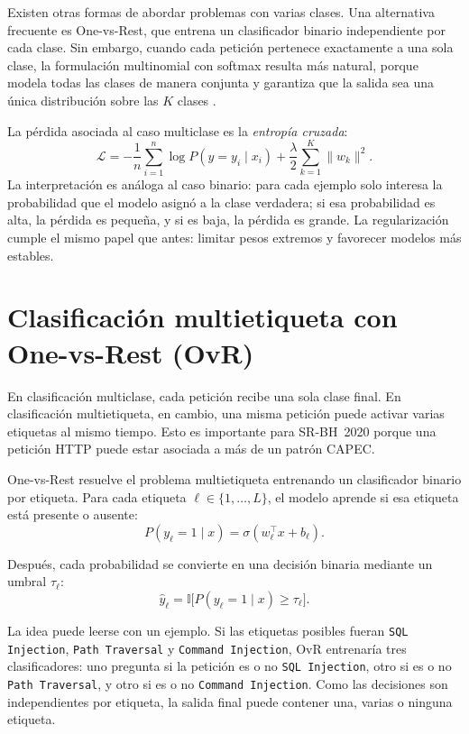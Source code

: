 \documentclass[12pt,oneside]{report}
\newcommand{\ind}{\mathbb{I}} %
\begin{document}
Existen otras formas de abordar problemas con varias clases. Una alternativa
frecuente es One-vs-Rest, que entrena un clasificador binario independiente
por cada clase. Sin embargo, cuando cada petición pertenece exactamente a
una sola clase, la formulación multinomial con softmax resulta más natural,
porque modela todas las clases de manera conjunta y garantiza que la salida
sea una única distribución sobre las $K$ clases
\cite{sklearn_logreg,islr_logreg}.

La pérdida asociada al caso multiclase es la \textit{entropía cruzada}:
\[
\mathcal{L}=
-\frac{1}{n}\sum_{i=1}^{n}\log P(y=y_i\mid x_i)
+ \frac{\lambda}{2}\sum_{k=1}^{K}\lVert w_k\rVert^2.
\]
La interpretación es análoga al caso binario: para cada ejemplo solo
interesa la probabilidad que el modelo asignó a la clase verdadera; si esa
probabilidad es alta, la pérdida es pequeña, y si es baja, la pérdida es
grande. La regularización cumple el mismo papel que antes: limitar pesos
extremos y favorecer modelos más estables.

\section{Clasificación multietiqueta con One-vs-Rest (OvR)}

En clasificación multiclase, cada petición recibe una sola clase final. En clasificación multietiqueta, en cambio, una misma petición puede activar varias etiquetas al mismo tiempo. Esto es importante para SR-BH~2020 porque una petición HTTP puede estar asociada a más de un patrón CAPEC.

One-vs-Rest resuelve el problema multietiqueta entrenando un clasificador binario por etiqueta. Para cada etiqueta $\ell\in\{1,\dots,L\}$, el modelo aprende si esa etiqueta está presente o ausente:
\[
P(y_\ell=1\mid x)=\sigma(w_\ell^\top x+b_\ell).
\]

Después, cada probabilidad se convierte en una decisión binaria mediante un umbral $\tau_\ell$:
\[
\hat{y}_{\ell}=\ind\big[P(y_\ell=1\mid x)\ge \tau_\ell\big].
\]

La idea puede leerse con un ejemplo. Si las etiquetas posibles fueran \texttt{SQL Injection}, \texttt{Path Traversal} y \texttt{Command Injection}, OvR entrenaría tres clasificadores: uno pregunta si la petición es o no \texttt{SQL Injection}, otro si es o no \texttt{Path Traversal}, y otro si es o no \texttt{Command Injection}. Como las decisiones son independientes por etiqueta, la salida final puede contener una, varias o ninguna etiqueta.
\end{document}
